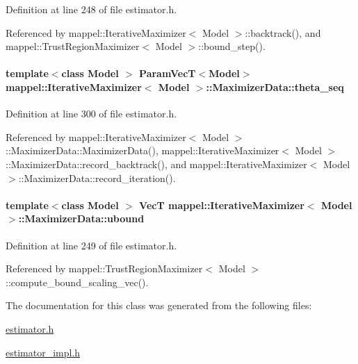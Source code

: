 Definition at line 248 of file estimator.\+h.



Referenced by mappel\+::\+Iterative\+Maximizer$<$ Model $>$\+::backtrack(), and mappel\+::\+Trust\+Region\+Maximizer$<$ Model $>$\+::bound\+\_\+step().

\paragraph[{\texorpdfstring{theta\+\_\+seq}{theta_seq}}]{\setlength{\rightskip}{0pt plus 5cm}template$<$class Model $>$ {\bf Param\+VecT}$<$Model$>$ {\bf mappel\+::\+Iterative\+Maximizer}$<$ Model $>$\+::Maximizer\+Data\+::theta\+\_\+seq\hspace{0.3cm}{\ttfamily [protected]}}\hypertarget{classmappel_1_1IterativeMaximizer_1_1MaximizerData_a2c8a2c8724b6f507cd8d4a2b6310324f}{}\label{classmappel_1_1IterativeMaximizer_1_1MaximizerData_a2c8a2c8724b6f507cd8d4a2b6310324f}


Definition at line 300 of file estimator.\+h.



Referenced by mappel\+::\+Iterative\+Maximizer$<$ Model $>$\+::\+Maximizer\+Data\+::\+Maximizer\+Data(), mappel\+::\+Iterative\+Maximizer$<$ Model $>$\+::\+Maximizer\+Data\+::record\+\_\+backtrack(), and mappel\+::\+Iterative\+Maximizer$<$ Model $>$\+::\+Maximizer\+Data\+::record\+\_\+iteration().

\paragraph[{\texorpdfstring{ubound}{ubound}}]{\setlength{\rightskip}{0pt plus 5cm}template$<$class Model $>$ {\bf VecT} {\bf mappel\+::\+Iterative\+Maximizer}$<$ Model $>$\+::Maximizer\+Data\+::ubound}\hypertarget{classmappel_1_1IterativeMaximizer_1_1MaximizerData_a222f9843c94b82c5ee9ad7c8af04ab52}{}\label{classmappel_1_1IterativeMaximizer_1_1MaximizerData_a222f9843c94b82c5ee9ad7c8af04ab52}


Definition at line 249 of file estimator.\+h.



Referenced by mappel\+::\+Trust\+Region\+Maximizer$<$ Model $>$\+::compute\+\_\+bound\+\_\+scaling\+\_\+vec().



The documentation for this class was generated from the following files\+:\begin{DoxyCompactItemize}
\item 
\hyperlink{estimator_8h}{estimator.\+h}\item 
\hyperlink{estimator__impl_8h}{estimator\+\_\+impl.\+h}\end{DoxyCompactItemize}
